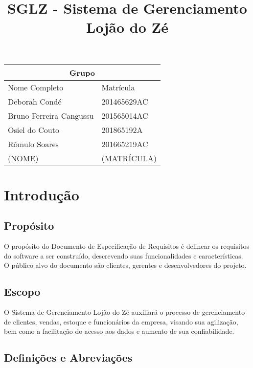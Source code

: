 \documentclass[notitlepage, draft]{article}
\title{\textbf{SGLZ} - Sistema de Gerenciamento Lojão do Zé}
\begin{document}
    \date{}
    \maketitle

\vspace{15cm}

\begin{tabular}{|p{10.5 cm}|p{4.5 cm}|}
    \hline
    \multicolumn{2}{|c|}{Grupo} \\
    \hline
    Nome Completo & Matrícula \\
    \hline
    Deborah Condé  & 201465629AC \\
    Bruno Ferreira Cangussu  & 201565014AC \\
    Osiel do Couto  & 201865192A \\
    Rômulo Soares  & 201665219AC \\
    (NOME)  & (MATRÍCULA) \\
    \hline
\end{tabular}
    
    
    \newpage
    
    
    \tableofcontents
    


    
    \newpage %
    
    \section{Introdução}
        \subsection{Propósito}
    O propósito do Documento de Especificação de Requisitos é delinear os requisitos do software a ser construído, descrevendo suas funcionalidades e características. O público alvo do documento são clientes, gerentes e desenvolvedores do projeto.
    
        \subsection{Escopo}
    O Sistema de Gerenciamento Lojão do Zé auxiliará o processo de gerenciamento de clientes, vendas, estoque e funcionários da empresa, visando sua agilização, bem como a facilitação do acesso aos dados e aumento de sua confiabilidade.
    
        \subsection{Definições e Abreviações}
        
\end{document}

